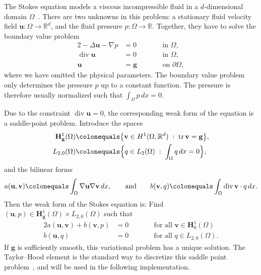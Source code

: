 \documentclass[a4paper,10pt,headings=normal,bibliography=totoc]{scrartcl}
\newcommand{\R}{\mathbb{R}}
\renewcommand{\div}{\operatorname{div}}
\begin{document}
The Stokes equation models a viscous incompressible
fluid in a $d$-dimensional domain $\Omega$~\cite{braess:2013}.
There are two unknowns in this problem: a stationary
fluid velocity field $\mathbf{u} : \Omega \to \R^d$, and the fluid pressure $p : \Omega \to \R$.
Together, they have to solve the boundary value problem
\begin{alignat*}{2}
 -\Delta \mathbf{u} - \nabla p & = 0  & \qquad & \text{in $\Omega$}, \\
 \div \mathbf{u} & = 0                &        & \text{in $\Omega$}, \\
                    \mathbf{u} & = \mathbf{g}  &        & \text{on $\partial \Omega$},
\end{alignat*}
where we have omitted the physical parameters.  The boundary value problem only determines the
pressure $p$ up to a constant function.  The pressure is therefore usually normalized such
that $\int_\Omega p\,dx = 0$.

Due to the constraint $\div \mathbf{u} = 0$, the corresponding weak form of the equation is a saddle-point problem.
Introduce the spaces
\begin{align*}
  \mathbf{H}^1_{\mathbf{g}}(\Omega)
      & \colonequals
      \big\{ \mathbf{v} \in H^1(\Omega,\R^d) \; :\; \operatorname{tr}{\mathbf{v}} = \mathbf{g} \big\}, \\
 L_{2,0}(\Omega) & \colonequals  \Big\{ q \in L_2(\Omega) \; :\; \int_\Omega q\,dx = 0 \Big\},
\end{align*}
and the bilinear forms
\begin{equation*}
 a(\mathbf{u},\mathbf{v}) \colonequals \int_\Omega \nabla \mathbf{u} \nabla \mathbf{v} \,dx,
 \qquad \text{and} \qquad
 b(\mathbf{v},q) \colonequals \int_\Omega \div \mathbf{v} \cdot q \,dx.
\end{equation*}
Then the weak form of the Stokes equation is: Find $(\mathbf{u},p) \in \mathbf{H}_{\mathbf{g}}^1(\Omega) \times L_{2,0}(\Omega)$ such that
\begin{alignat*}{2}
 a(\mathbf{u},\mathbf{v}) + b(\mathbf{v},p) & = 0 & \qquad & \text{for all $\mathbf{v} \in \mathbf{H}_0^1(\Omega)$} \\
 b(\mathbf{u},q)\qquad\qquad & = 0       &        & \text{for all $q \in L_{2,0}(\Omega)$}.
\end{alignat*}
If $\mathbf{g}$ is sufficiently smooth, this variational problem has a unique solution.
The Taylor--Hood element is the standard way to discretize this saddle point problem~\cite{braess:2013},
and will be used in the following implementation.
\end{document}
